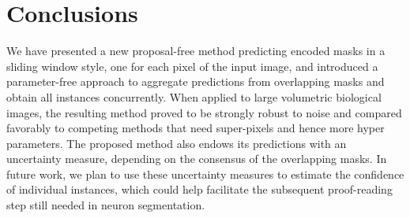 
\section{Conclusions}
We have presented a new proposal-free method predicting encoded \maskname masks in a sliding window style, one for each pixel of the input image, and introduced a parameter-free approach to aggregate predictions from overlapping masks and obtain all instances concurrently.
When applied to large volumetric biological images, the resulting method proved to be strongly robust to noise and compared favorably to competing methods that need super-pixels and hence more hyper parameters.
The proposed method also endows its predictions with an uncertainty measure, depending on the consensus of the overlapping  \maskname masks. In future work, we plan to use these uncertainty measures to estimate the confidence of individual instances, which could help facilitate the subsequent proof-reading step still needed in neuron segmentation.
